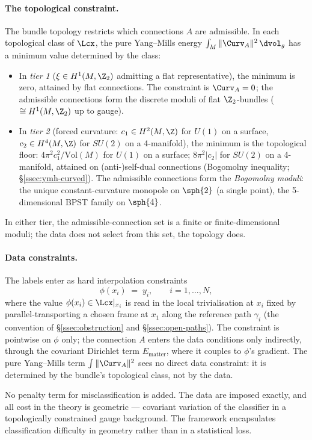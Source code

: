 \paragraph{The topological constraint.} The bundle topology
restricts which connections $A$ are admissible. In each topological
class of $\Lcx$, the pure Yang--Mills energy
$\int_M\|\Curv_A\|^2\,\dvol_g$ has a minimum value determined by the
class:
\begin{itemize}[leftmargin=2em]
\item In \emph{tier 1} ($\xi\in H^1(M,\Z_2)$ admitting a flat
representative), the minimum is zero, attained by flat connections.
The constraint is $\Curv_A=0$; the admissible connections form the
discrete moduli of flat $\Z_2$-bundles ($\cong H^1(M,\Z_2)$ up to
gauge).
\item In \emph{tier 2} (forced curvature: $c_1\in H^2(M,\Z)$ for
$U(1)$ on a surface, $c_2\in H^4(M,\Z)$ for $SU(2)$ on a 4-manifold),
the minimum is the topological floor: $4\pi^2 c_1^2/\mathrm{Vol}(M)$
for $U(1)$ on a surface; $8\pi^2|c_2|$ for $SU(2)$ on a 4-manifold,
attained on (anti-)self-dual connections (Bogomolny inequality;
\S\ref{ssec:ymh-curved}). The admissible connections form the
\emph{Bogomolny moduli}: the unique constant-curvature monopole on
$\sph{2}$ (a single point), the 5-dimensional BPST family on
$\sph{4}$.
\end{itemize}
In either tier, the admissible-connection set is a finite or
finite-dimensional moduli; the data does not select from this set,
the topology does.

\paragraph{Data constraints.} The labels enter as hard interpolation
constraints
\[
   \phi(x_i) \;=\; y_i, \qquad i=1,\dots,N,
\]
where the value $\phi(x_i)\in\Lcx|_{x_i}$ is read in the local
trivialisation at $x_i$ fixed by parallel-transporting a chosen
frame at $x_1$ along the reference path $\gamma_i$
(the convention of \S\ref{ssec:obstruction} and
\S\ref{ssec:open-paths}). The constraint is pointwise on $\phi$
only; the connection $A$ enters the data conditions only indirectly,
through the covariant Dirichlet term $E_{\mathrm{matter}}$, where it
couples to $\phi$'s gradient. The pure Yang--Mills term
$\int\|\Curv_A\|^2$ sees no direct data constraint: it is determined
by the bundle's topological class, not by the data.

No penalty term for misclassification is added. The data are imposed
exactly, and all cost in the theory is geometric --- covariant
variation of the classifier in a topologically constrained gauge
background. The framework encapsulates classification difficulty in
geometry rather than in a statistical loss.

